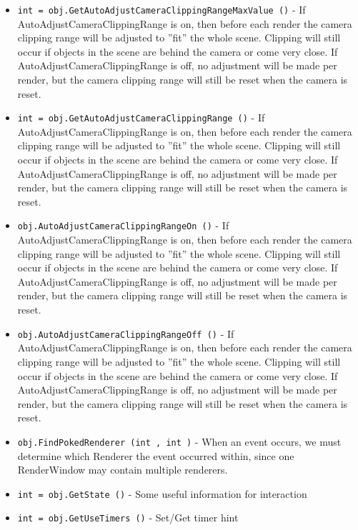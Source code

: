 \begin{itemize}
\item  \verb|int = obj.GetAutoAdjustCameraClippingRangeMaxValue ()| -  If AutoAdjustCameraClippingRange is on, then before each render the
 camera clipping range will be adjusted to ''fit'' the whole scene. Clipping
 will still occur if objects in the scene are behind the camera or
 come very close. If AutoAdjustCameraClippingRange is off, no adjustment
 will be made per render, but the camera clipping range will still
 be reset when the camera is reset.

\item  \verb|int = obj.GetAutoAdjustCameraClippingRange ()| -  If AutoAdjustCameraClippingRange is on, then before each render the
 camera clipping range will be adjusted to ''fit'' the whole scene. Clipping
 will still occur if objects in the scene are behind the camera or
 come very close. If AutoAdjustCameraClippingRange is off, no adjustment
 will be made per render, but the camera clipping range will still
 be reset when the camera is reset.

\item  \verb|obj.AutoAdjustCameraClippingRangeOn ()| -  If AutoAdjustCameraClippingRange is on, then before each render the
 camera clipping range will be adjusted to ''fit'' the whole scene. Clipping
 will still occur if objects in the scene are behind the camera or
 come very close. If AutoAdjustCameraClippingRange is off, no adjustment
 will be made per render, but the camera clipping range will still
 be reset when the camera is reset.

\item  \verb|obj.AutoAdjustCameraClippingRangeOff ()| -  If AutoAdjustCameraClippingRange is on, then before each render the
 camera clipping range will be adjusted to ''fit'' the whole scene. Clipping
 will still occur if objects in the scene are behind the camera or
 come very close. If AutoAdjustCameraClippingRange is off, no adjustment
 will be made per render, but the camera clipping range will still
 be reset when the camera is reset.

\item  \verb|obj.FindPokedRenderer (int , int )| -  When an event occurs, we must determine which Renderer the event
 occurred within, since one RenderWindow may contain multiple
 renderers. 

\item  \verb|int = obj.GetState ()| -  Some useful information for interaction

\item  \verb|int = obj.GetUseTimers ()| -  Set/Get timer hint


\end{itemize}
